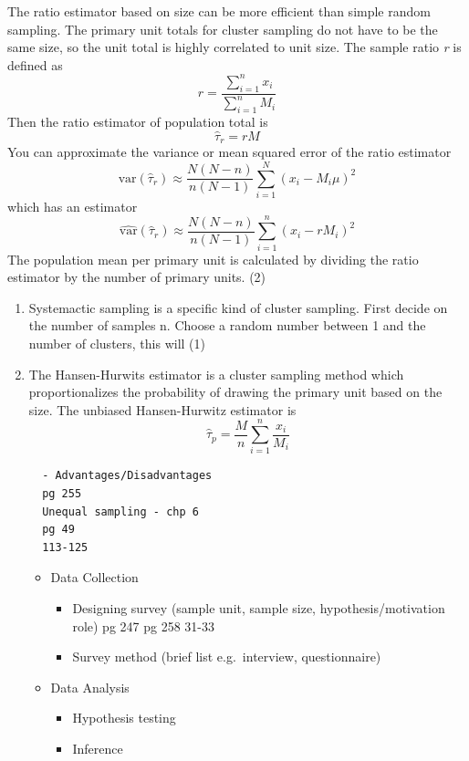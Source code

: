 \documentclass[12pt,twoside]{reedthesis}
\providecommand{\tightlist}{%
  \setlength{\itemsep}{0pt}\setlength{\parskip}{0pt}}
\begin{document}
The ratio estimator based on size can be more efficient than simple random sampling. The primary unit totals for cluster sampling do not have to be the same size, so the unit total is highly correlated to unit size. The sample ratio \emph{r} is defined as
\[
r = \frac{\sum_{i=1}^n x_i}{\sum_{i=1}^n M_i}
\]
Then the ratio estimator of population total is
\[
\widehat{\tau}_r = rM
\]
You can approximate the variance or mean squared error of the ratio estimator
\[
\text{var} \left( \hat{\tau}_r \right) \approx \frac{N(N-n)}{n(N-1)} \sum_{i=1}^N
\left( x_i - M_i\mu \right)^2 
\]
which has an estimator
\[
\widehat{\text{var}} \left( \hat{\tau}_r \right) \approx \frac{N(N-n)}{n(N-1)} \sum_{i=1}^n
\left( x_i - rM_i\right)^2 
\]
The population mean per primary unit is calculated by dividing the ratio estimator by the number of primary units. (2)
\begin{enumerate}
\def\labelenumi{(\arabic{enumi})}
\item
  Systemactic sampling is a specific kind of cluster sampling. First decide on the number of samples n. Choose a random number between 1 and the number of clusters, this will (1)
\item
  The Hansen-Hurwits estimator is a cluster sampling method which proportionalizes the probability of drawing the primary unit based on the size. The unbiased Hansen-Hurwitz estimator is
  \[
  \hat{\tau}_p = \frac{M}{n}\sum^n_{i=1}\frac{x_i}{M_i}
  \]
\begin{verbatim}
  - Advantages/Disadvantages
  pg 255
  Unequal sampling - chp 6
  pg 49
  113-125
\end{verbatim}
  \begin{itemize}
  \tightlist
  \item
    Data Collection
    \begin{itemize}
    \tightlist
    \item
      Designing survey (sample unit, sample size, hypothesis/motivation role)
      pg 247
      pg 258
      31-33
    \item
      Survey method (brief list e.g.~interview, questionnaire)
    \end{itemize}
  \item
    Data Analysis
    \begin{itemize}
    \tightlist
    \item
      Hypothesis testing
    \item
      Inference
    \end{itemize}
  \end{itemize}
\end{enumerate}
\end{document}
